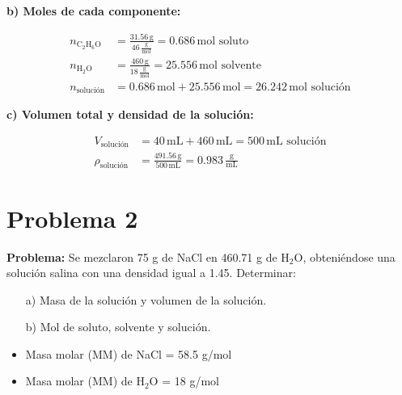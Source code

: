 \documentclass{article}
\begin{document}
\begin{multicols}{2}
\textbf{b) Moles de cada componente:}

\begin{align*}
    n_{\text{C}_2\text{H}_6\text{O}} &= \frac{31.56 \, \text{g}}{46 \, \frac{\text{g}}{\text{mol}}} = 0.686 \, \text{mol soluto} \\[10pt]
    n_{\text{H}_2\text{O}} &= \frac{460 \, \text{g}}{18 \, \frac{\text{g}}{\text{mol}}} = 25.556 \, \text{mol solvente} \\[10pt]
    n_{\text{solución}} &= 0.686 \, \text{mol} + 25.556 \, \text{mol} = 26.242 \, \text{mol solución}
\end{align*}

\textbf{c) Volumen total y densidad de la solución:}

\begin{align*}
    V_{\text{solución}} &= 40 \, \text{mL} + 460 \, \text{mL} = 500 \, \text{mL solución} \\[10pt]
    \rho_{\text{solución}} &= \frac{491.56 \, \text{g}}{500 \, \text{mL}} = 0.983 \, \frac{\text{g}}{\text{mL}}
\end{align*}

\end{multicols} %









\newpage
\section*{Problema 2}
\textbf{Problema:}
Se mezclaron 75 g de NaCl en 460.71 g de H$_2$O, obteniéndose una solución salina con una densidad igual a 1.45. Determinar:

\begin{itemize} \item[a)] Masa de la solución y volumen de la solución. \item[b)] Mol de soluto, solvente y solución. \end{itemize}

\begin{itemize} \item Masa molar (MM) de NaCl = 58.5 g/mol \item Masa molar (MM) de H$_2$O = 18 g/mol \end{itemize}
\end{document}
